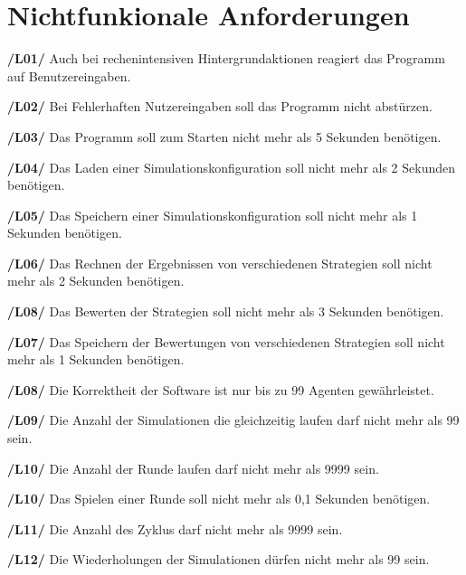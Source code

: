 \section{Nichtfunkionale Anforderungen}

\textbf{/L01/ }
Auch bei rechenintensiven Hintergrundaktionen reagiert das Programm auf Benutzereingaben.

\textbf{/L02/}
Bei Fehlerhaften Nutzereingaben soll das Programm nicht abstürzen.

\textbf{/L03/}
Das Programm soll zum Starten nicht mehr als 5 Sekunden benötigen.

\textbf{/L04/}
Das Laden einer Simulationskonfiguration soll nicht mehr als 2 Sekunden benötigen.

\textbf{/L05/}
Das Speichern einer Simulationskonfiguration soll nicht mehr als 1 Sekunden benötigen.

\textbf{/L06/}
Das Rechnen der Ergebnissen von verschiedenen Strategien soll nicht mehr als 2 Sekunden benötigen.

\textbf{/L08/}
Das Bewerten der Strategien soll nicht mehr als 3 Sekunden benötigen.

\textbf{/L07/}
Das Speichern der Bewertungen von verschiedenen Strategien soll nicht mehr als 1 Sekunden benötigen.

\textbf{/L08/}
Die Korrektheit der Software ist nur bis zu 99 Agenten gewährleistet.

\textbf{/L09/}
Die Anzahl der Simulationen die gleichzeitig laufen darf nicht mehr als 99 sein.

\textbf{/L10/}
Die Anzahl der Runde laufen darf nicht mehr als 9999 sein.

\textbf{/L10/}
Das Spielen einer Runde soll nicht mehr als 0,1 Sekunden benötigen.

\textbf{/L11/}
Die Anzahl des Zyklus darf nicht mehr als 9999 sein.

\textbf{/L12/}
Die Wiederholungen der Simulationen dürfen nicht mehr als 99 sein.